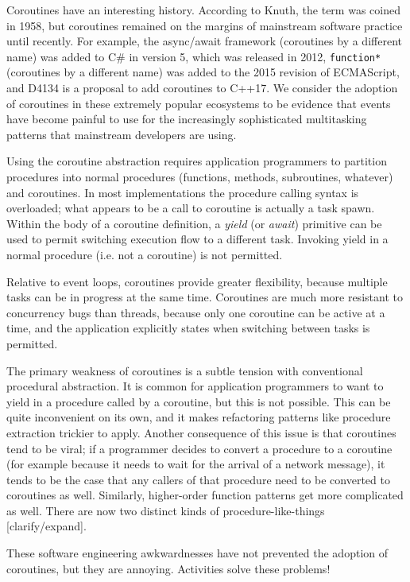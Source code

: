 \documentclass[10pt,preprint]{sigplanconf}
\begin{document}
Coroutines have an interesting history.
According to Knuth, the term was coined in 1958, but coroutines remained on the margins of mainstream software practice until recently.
For example, the async/await framework (coroutines by a different name) was added to C\# in version 5, which was released in 2012, \texttt{function*} (coroutines by a different name) was added to the 2015 revision of ECMAScript, and D4134 is a proposal to add coroutines to C++17.
We consider the adoption of coroutines in these extremely popular ecosystems to be evidence that events have become painful to use for the increasingly sophisticated multitasking patterns that mainstream developers are using.

Using the coroutine abstraction requires application programmers to partition procedures into normal procedures (functions, methods, subroutines, whatever) and coroutines.
In most implementations the procedure calling syntax is overloaded; what appears to be a call to coroutine is actually a task spawn.
Within the body of a coroutine definition, a \emph{yield} (or \emph{await}) primitive can be used to permit switching execution flow to a different task.
Invoking yield in a normal procedure (i.e. not a coroutine) is not permitted.

Relative to event loops, coroutines provide greater flexibility, because multiple tasks can be in progress at the same time.
Coroutines are much more resistant to concurrency bugs than threads, because only one coroutine can be active at a time, and the application explicitly states when switching between tasks is permitted.

The primary weakness of coroutines is a subtle tension with conventional procedural abstraction.
It is common for application programmers to want to yield in a procedure called by a coroutine, but this is not possible.
This can be quite inconvenient on its own, and it makes refactoring patterns like procedure extraction trickier to apply.
Another consequence of this issue is that coroutines tend to be viral; if a programmer decides to convert a procedure to a coroutine (for example because it needs to wait for the arrival of a network message), it tends to be the case that any callers of that procedure need to be converted to coroutines as well.
Similarly, higher-order function patterns get more complicated as well.
There are now two distinct kinds of procedure-like-things [clarify/expand].

These software engineering awkwardnesses have not prevented the adoption of coroutines, but they are annoying.
Activities solve these problems!
\end{document}
